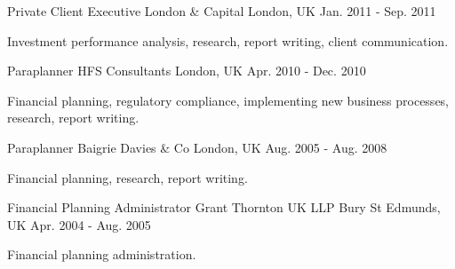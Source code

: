 

\begin{cventries}

  \cventry
    {Private Client Executive} %
    {London \& Capital} %
    {London, UK} %
    {Jan. 2011 - Sep. 2011} %
    {
      \begin{cvitems} %
        \item {Investment performance analysis, research, report writing, client communication.}
      \end{cvitems}
    }

  \cventry
    {Paraplanner} %
    {HFS Consultants} %
    {London, UK} %
    {Apr. 2010 - Dec. 2010} %
    {
      \begin{cvitems} %
        \item {Financial planning, regulatory compliance, implementing new business processes, research, report writing.}
      \end{cvitems}
    }

  \cventry
    {Paraplanner} %
    {Baigrie Davies \& Co} %
    {London, UK} %
    {Aug. 2005 - Aug. 2008} %
    {
      \begin{cvitems} %
        \item {Financial planning, research, report writing.}
      \end{cvitems}
    }

  \cventry
    {Financial Planning Administrator} %
    {Grant Thornton UK LLP} %
    {Bury St Edmunds, UK} %
    {Apr. 2004 - Aug. 2005} %
    {
      \begin{cvitems} %
        \item {Financial planning administration.}
      \end{cvitems}
    }


\end{cventries}
